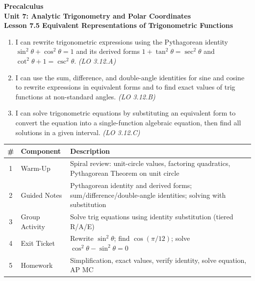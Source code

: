 \documentclass[10pt]{article}
\begin{document}
\vspace{-0.8in}

\begin{center}
  {\color{white}\textbf{\LARGE Precalculus}}\\[4pt]
  {\color{skymid}\large\textbf{Unit 7: Analytic Trigonometry and Polar Coordinates}}\\[6pt]
  {\color{white}\textbf{\large Lesson 7.5 \quad Equivalent Representations of Trigonometric Functions}}
\end{center}

\vspace{0.22in}
\namedateperiod
\vspace{0.18in}

\begin{learningtargetbox}
\small
\begin{enumerate}[leftmargin=1.5em, itemsep=5pt]
  \item I can rewrite trigonometric expressions using the Pythagorean identity
    $\sin^2\theta + \cos^2\theta = 1$ and its derived forms
    $1 + \tan^2\theta = \sec^2\theta$ and $\cot^2\theta + 1 = \csc^2\theta$.
    \hfill\textit{(LO 3.12.A)}
  \item I can use the sum, difference, and double-angle identities for sine and cosine
    to rewrite expressions in equivalent forms and to find exact values of trig functions
    at non-standard angles. \hfill\textit{(LO 3.12.B)}
  \item I can solve trigonometric equations by substituting an equivalent form to convert
    the equation into a single-function algebraic equation, then find all solutions in a
    given interval. \hfill\textit{(LO 3.12.C)}
\end{enumerate}
\end{learningtargetbox}

\vspace{0.14in}

\begin{tocbox}
\small
\renewcommand{\arraystretch}{1.5}
\begin{tabularx}{\linewidth}{@{} c l X @{}}
\rowcolor{sky}
\textbf{\#} & \textbf{Component} & \textbf{Description} \\
\midrule
1 & Warm-Up        & Spiral review: unit-circle values, factoring quadratics, Pythagorean Theorem on unit circle \\
2 & Guided Notes   & Pythagorean identity and derived forms; sum/difference/double-angle identities; solving with substitution \\
3 & Group Activity & Solve trig equations using identity substitution (tiered R/A/E) \\
4 & Exit Ticket    & Rewrite $\sin^2\theta$; find $\cos(\pi/12)$; solve $\cos^2\theta - \sin^2\theta = 0$ \\
5 & Homework       & Simplification, exact values, verify identity, solve equation, AP MC \\
\end{tabularx}
\end{tocbox}
\end{document}
